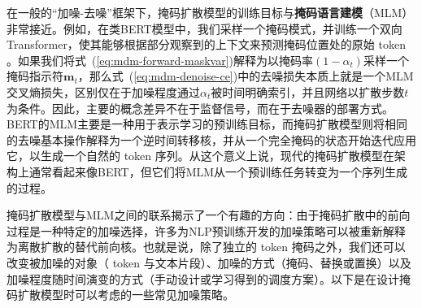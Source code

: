 \documentclass[UTF8,a4paper,zihao=-4,oneside,openany]{ctexbook}
\begin{document}
在一般的“加噪-去噪”框架下，掩码扩散模型的训练目标与\textbf{掩码语言建模}（MLM）非常接近。例如，在类BERT模型中，我们采样一个掩码模式，并训练一个双向Transformer，使其能够根据部分观察到的上下文来预测掩码位置处的原始 token \citep{devlin-etal:2019bert}。如果我们将式~(\ref{eq:mdm-forward-maskvar})解释为以掩码率$(1-\alpha_t)$采样一个掩码指示符$\mathbf{m}_t$，那么式~(\ref{eq:mdm-denoise-ce})中的去噪损失本质上就是一个MLM交叉熵损失，区别仅在于加噪程度通过$\alpha_t$被时间明确索引，并且网络以扩散步数$t$为条件。因此，主要的概念差异不在于监督信号，而在于去噪器的部署方式。BERT的MLM主要是一种用于表示学习的预训练目标，而掩码扩散模型则将相同的去噪基本操作解释为一个逆时间转移核，并从一个完全掩码的状态开始迭代应用它，以生成一个自然的 token 序列。从这个意义上说，现代的掩码扩散模型在架构上通常看起来像BERT，但它们将MLM从一个预训练任务转变为一个序列生成的过程。

掩码扩散模型与MLM之间的联系揭示了一个有趣的方向：由于掩码扩散中的前向过程是一种特定的加噪选择，许多为NLP预训练开发的加噪策略可以被重新解释为离散扩散的替代前向核。也就是说，除了独立的 token 掩码之外，我们还可以改变被加噪的对象（ token 与文本片段）、加噪的方式（掩码、替换或置换）以及加噪程度随时间演变的方式（手动设计或学习得到的调度方案）。以下是在设计掩码扩散模型时可以考虑的一些常见加噪策略。
\end{document}
